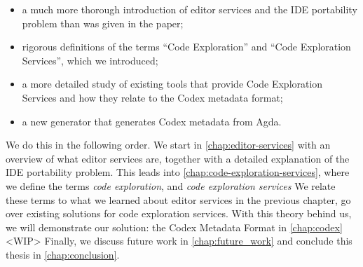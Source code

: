 \begin{itemize}
    \item a much more thorough introduction of editor services and the IDE portability problem than was given in the paper;
    \item rigorous definitions of the terms ``Code Exploration'' and ``Code Exploration Services'', which we introduced;
    \item a more detailed study of existing tools that provide Code Exploration Services and how they relate to the Codex metadata format;
    \item a new generator that generates Codex metadata from Agda.
\end{itemize}

We do this in the following order.
We start in \cref{chap:editor-services} with an overview of what editor services are, together with a detailed explanation of the \ac{IDE} portability problem.
This leads into \cref{chap:code-exploration-services}, where we define the terms \emph{code exploration}, and \emph{code exploration services}
We relate these terms to what we learned about editor services in the previous chapter, go over existing solutions for code exploration services.
With this theory behind us, we will demonstrate our solution: the Codex Metadata Format in \cref{chap:codex}
<WIP> Finally, we discuss future work in \cref{chap:future_work} and conclude this thesis in \cref{chap:conclusion}.


